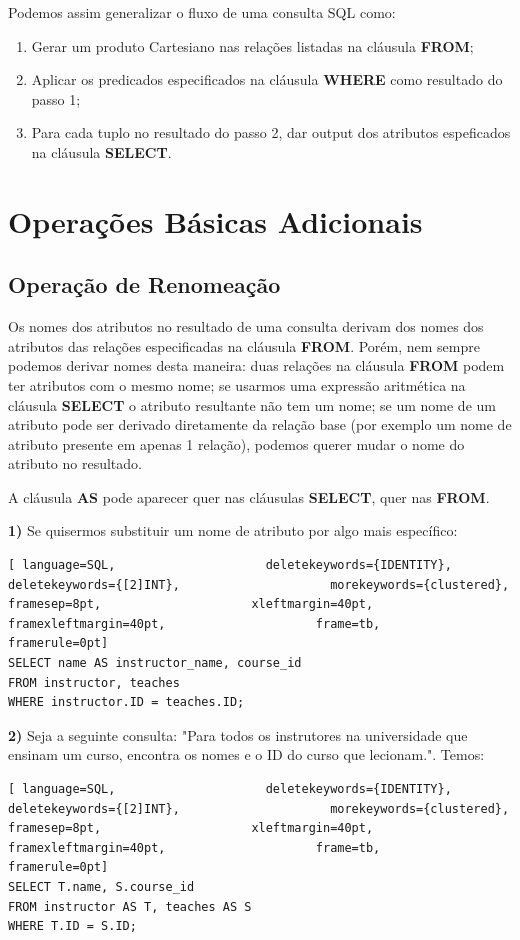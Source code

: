 \documentclass[titlepage]{book}
\theoremstyle{definition}
\begin{document}
Podemos assim generalizar o fluxo de uma consulta SQL como:
\begin{enumerate}[label=\color{blue}\theenumi]
    \item Gerar um produto Cartesiano nas relações listadas na cláusula \textbf{FROM};
    \item Aplicar os predicados especificados na cláusula \textbf{WHERE} como resultado do passo 1;
    \item Para cada tuplo no resultado do passo 2, dar output dos atributos espeficados na cláusula \textbf{SELECT}.
\end{enumerate}

\section{Operações Básicas Adicionais}

\subsection{Operação de Renomeação}
Os nomes dos atributos no resultado de uma consulta derivam dos nomes dos atributos das relações especificadas na cláusula \textbf{FROM}.
Porém, nem sempre podemos derivar nomes desta maneira: duas relações na cláusula \textbf{FROM} podem ter atributos com o mesmo nome; se usarmos uma expressão aritmética na cláusula \textbf{SELECT} o atributo resultante não tem um nome; se um nome de um atributo pode ser derivado diretamente da relação base (por exemplo um nome de atributo presente em apenas 1 relação), podemos querer mudar o nome do atributo no resultado.

A cláusula \textbf{AS} pode aparecer quer nas cláusulas \textbf{SELECT}, quer nas \textbf{FROM}.

\textbf{1)} Se quisermos substituir um nome de atributo por algo mais específico:
\begin{lstlisting}[ language=SQL,                     deletekeywords={IDENTITY},                     deletekeywords={[2]INT},                     morekeywords={clustered},                     framesep=8pt,                     xleftmargin=40pt,                     framexleftmargin=40pt,                     frame=tb,                     framerule=0pt]
SELECT name AS instructor_name, course_id
FROM instructor, teaches
WHERE instructor.ID = teaches.ID;
\end{lstlisting}

\textbf{2)} Seja a seguinte consulta: "Para todos os instrutores na universidade que ensinam um curso, encontra os nomes e o ID do curso que lecionam.". Temos:
\begin{lstlisting}[ language=SQL,                     deletekeywords={IDENTITY},                     deletekeywords={[2]INT},                     morekeywords={clustered},                     framesep=8pt,                     xleftmargin=40pt,                     framexleftmargin=40pt,                     frame=tb,                     framerule=0pt]
SELECT T.name, S.course_id
FROM instructor AS T, teaches AS S
WHERE T.ID = S.ID;
\end{lstlisting}
\end{document}

